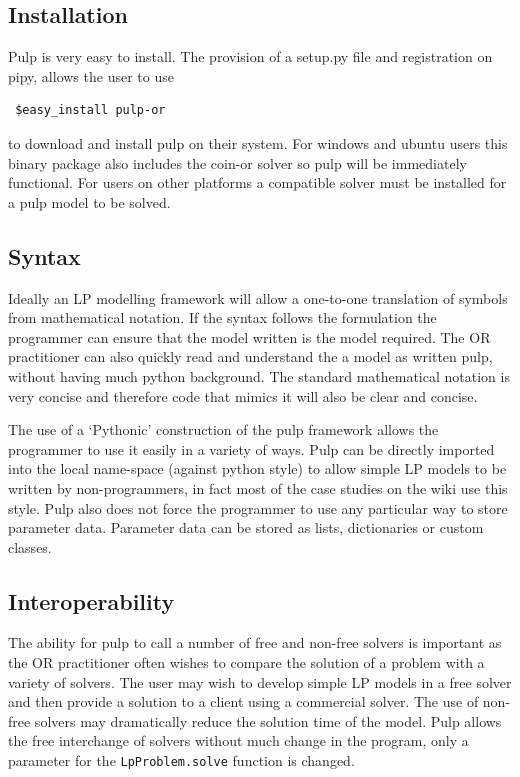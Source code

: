 \documentclass[a4paper,oneside]{arlimsTPPM}
\begin{document}
\subsection{Installation}
Pulp is very easy to install. The provision of a setup.py file and registration on pipy, allows the user
to use
\begin{verbatim}
 $easy_install pulp-or
\end{verbatim}
to download and install pulp on their system. For windows and ubuntu users this binary package also includes
the coin-or \cite{coin-or} solver so pulp will be immediately functional. For users on other platforms a compatible 
solver must be installed for a pulp model to be solved.

\subsection{Syntax}
Ideally an LP modelling framework will allow a one-to-one translation of symbols from mathematical notation. If the syntax follows the formulation the programmer can ensure that the model written is the model required. The OR practitioner can also quickly read and understand the a model as written pulp, without having much python background. The standard mathematical notation is very concise  and therefore code that mimics it will also be clear and concise.

The use of a `Pythonic' construction of the pulp framework allows the programmer to use it easily in a variety of ways. Pulp can be directly imported into the local name-space (against python style) to allow simple LP models to be written by non-programmers, in fact most of the case studies on the wiki \cite{pulpwiki} use this style. Pulp also does not force the programmer to use any particular way to store parameter data. Parameter data can be stored as lists, dictionaries or custom classes.

\subsection{Interoperability}
The ability for pulp to call a number of free and non-free solvers is important as the OR practitioner often wishes to compare the solution of a problem with a variety of solvers. The user may wish to develop simple LP models in a free solver and then provide a solution to a client using a commercial solver. The use of non-free solvers may dramatically reduce the solution time of the model. Pulp allows the free interchange of solvers without much change in the program, only a parameter for the \lstinline{LpProblem.solve} function is changed.
\end{document}
